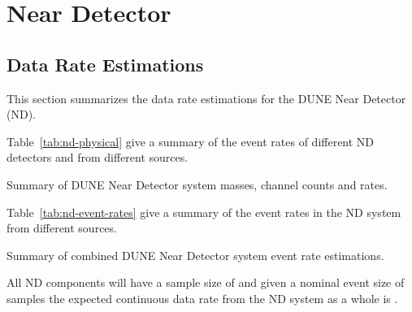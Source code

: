 \chapter{Near Detector}
\label{ch:alt-annex-rate}

\section{Data Rate Estimations}

This section summarizes the data rate estimations for the DUNE Near
Detector (ND).

Table~\ref{tab:nd-physical} give a summary of the event rates of
different ND detectors and from different sources.

\begin{table}[htbp]
  \centering
  \caption{Summary of DUNE Near Detector system masses, channel counts
    and rates.}
  
  \label{tab:nd-physical}
\end{table}

Table~\ref{tab:nd-event-rates} give a summary of the event rates in
the ND system from different sources.

\begin{table}[htbp]
  \centering
  \caption{Summary of combined DUNE Near Detector system event rate estimations.}
  
  \label{tab:nd-event-rates}
\end{table}

All ND components will have a sample size of \ndbytesperchannel and
given a nominal event size of \ndeventsize samples the expected
continuous data rate from the ND system as a whole is \nddatarate.